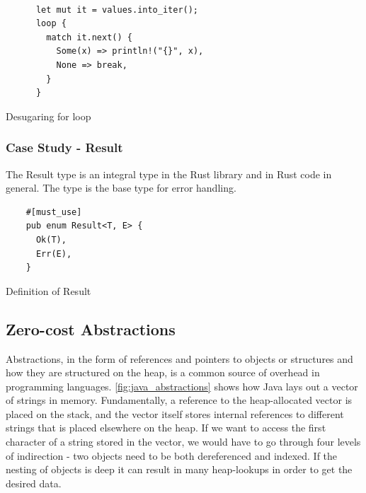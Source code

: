 \begin{minipage}[b]{0.5\linewidth}
  \begin{listing}[H]
    \begin{verbatim}

      let mut it = values.into_iter();
      loop {
        match it.next() {
          Some(x) => println!("{}", x),
          None => break,
        }
      }

    \end{verbatim}

    \caption{Desugaring for loop}
    \label{lst:rust:desugared-for}
  \end{listing}
\end{minipage}

\subsubsection{Case Study - Result}

The Result type is an integral type in the Rust library and in Rust code in general.
The type is the base type for error handling.

\begin{listing}[H]
  \begin{verbatim}
    #[must_use]
    pub enum Result<T, E> {
      Ok(T),
      Err(E),
    }
\end{verbatim}
\caption{Definition of Result}
\label{lst:rust:result}
\end{listing}

\subsection{Zero-cost Abstractions}
\label{chap:zero_cost_abstractions}

Abstractions, in the form of references and pointers to objects or structures and how they are
structured on the heap, is a common source of overhead in programming languages.
\autoref{fig:java_abstractions}  shows how Java lays out a vector of
strings in memory.
Fundamentally, a reference to the heap-allocated vector is placed on the stack, and the vector itself stores internal references to different strings that is placed elsewhere on the heap.
If we want to access the first character of a string stored in the vector, we would have to go through four levels of indirection - two objects need to be both dereferenced and indexed.
If the nesting of objects is deep it can result in many heap-lookups in order to get the desired data.

